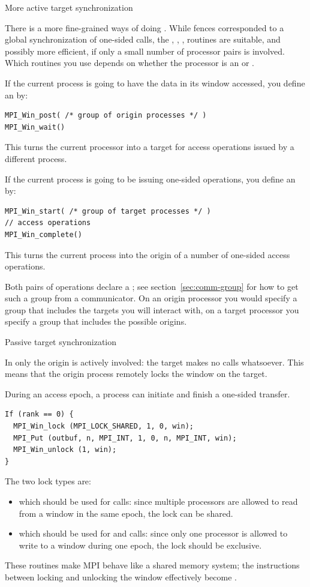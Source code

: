  {More active target synchronization}

There is a more fine-grained ways of doing 
. While fences
corresponded to a global synchronization of one-sided calls,
the ,
, ,  routines
are suitable, and possibly more efficient,
if only a small number of processor pairs is
involved.  Which routines
you use depends on whether the processor is an  or
.

If the current process is going to have the data in its window accessed,
you define an  by:
\begin{verbatim}
MPI_Win_post( /* group of origin processes */ )
MPI_Win_wait()
\end{verbatim}
This turns the current processor into a target for access operations issued
by a different process.

If the current process is going to be issuing one-sided operations,
you define an  by:
\begin{verbatim}
MPI_Win_start( /* group of target processes */ )
// access operations
MPI_Win_complete()
\end{verbatim}
This turns the current process into the origin of a number of
one-sided access operations.

Both pairs of operations declare a
; see section~\ref{sec:comm-group}
for how to get such a group from a communicator.
On an origin processor you would specify a group that includes the targets
you will interact with, on a target processor you specify a group
that includes the possible origins.

 {Passive target synchronization}

In  only the origin is
actively involved: the target makes no calls whatsoever.
This means that the origin process remotely locks the window
on the target.

During an access epoch, a process can initiate and finish a one-sided
transfer.
\begin{verbatim}
If (rank == 0) {
  MPI_Win_lock (MPI_LOCK_SHARED, 1, 0, win);
  MPI_Put (outbuf, n, MPI_INT, 1, 0, n, MPI_INT, win);
  MPI_Win_unlock (1, win);
}
\end{verbatim}
The two lock types are:
\begin{itemize}
\item {} which should be used for 
  calls: since multiple processors are allowed to read from a window
  in the same epoch, the lock can be shared.
\item {} which should be used for
   and  calls: since only one processor is
  allowed to write to a window during one epoch, the lock should be
  exclusive.
\end{itemize}
These routines make MPI behave like a shared memory system; the
instructions between locking and unlocking the window effectively
become .

